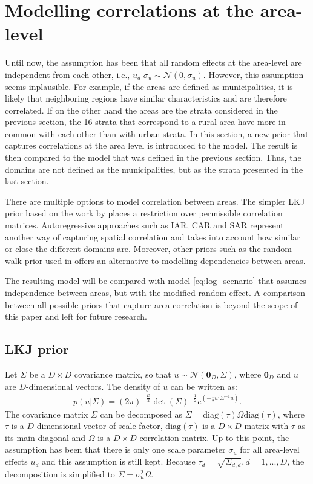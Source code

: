 \section{Modelling correlations at the area-level}
\label{ch:area_corr}

Until now, the assumption has been that all random effects at the area-level are independent from each other, i.e., $u_d|\sigma_u \sim \mathcal N (0, \sigma_u)$.
However, this assumption seems inplausible.
For example, if the areas are defined as municipalities, it is likely that neighboring regions have similar characteristics and are therefore correlated.
If on the other hand the areas are the strata considered in the previous section, the 16 strata that correspond to a rural area have more in common with each other than with urban strata.
In this section, a new prior that captures correlations at the area level is introduced to the model.
The result is then compared to the model that was defined in the previous section.
Thus, the domains are not defined as the municipalities, but as the strata presented in the last section.

There are multiple options to model correlation between areas.
The simpler LKJ prior based on the work by \cite{lewandowski_generating_2009} places a restriction over permissible correlation matrices.
Autoregressive approaches such as IAR, CAR and SAR \citep{chung_bayesian_2020} represent another way of capturing spatial correlation and takes into account how similar or close the different domains are.
Moreover, other priors such as the random walk prior used in \cite{gao_improving_2021} offers an alternative to modelling dependencies between areas.

The resulting model will be compared with model \ref{eq:log_scenario} that assumes independence between areas, but with the modified random effect.
A comparison between all possible priors that capture area correlation is beyond the scope of this paper and left for future research.

\subsection{LKJ prior}

Let $\Sigma$ be a $D \times D$ covariance matrix, so that $u \sim \mathcal{N}(\boldsymbol{0}_D, \Sigma)$, where $\boldsymbol 0_D$ and $u$ are $D$-dimensional vectors.
The density of $u$ can be written as:
\begin{gather*}
    p(u|\Sigma) = (2\pi)^{-\frac D 2}\det(\Sigma)^{-\frac 1 2} e^{(-\frac 1 2 u'\Sigma^{-1} u)}.
\end{gather*}
The covariance matrix $\Sigma$ can be decomposed as $\Sigma = \text{diag}(\tau)\Omega\text{diag}(\tau)$, where $\tau$ is a $D$-dimensional vector of scale factor, $\text{diag}(\tau)$ is a $D \times D$ matrix with $\tau$ as its main diagonal and $\Omega$ is a $D \times D$ correlation matrix.
Up to this point, the assumption has been that there is only one scale parameter $\sigma_u$ for all area-level effects $u_d$ and this assumption is still kept.
Because $\tau_d = \sqrt{\Sigma_{d, d}}, d = 1, ..., D$, the decomposition is simplified to $\Sigma = \sigma_u^2 \Omega$.


